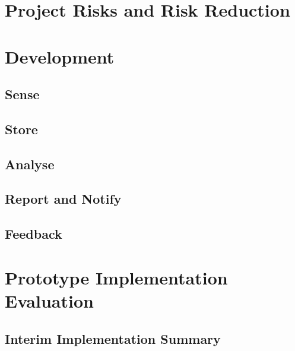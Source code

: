 \documentclass[10pt,a4paper]{article}
\begin{document}
\section{Project Risks and Risk Reduction}
\label{sec:risks}

\section{Development}
\label{sec:development}


\subsection{Sense}
\label{sec:sense}


\subsection{Store}
\label{sec:store}


\subsection{Analyse}
\label{sec:analyse}


\subsection{Report and Notify}
\label{sec:report}


\subsection{Feedback}
\label{sec:feedback}

\section{Prototype Implementation Evaluation}
\label{sec:prototype}


\subsection{Interim Implementation Summary}
\label{sec:interim_summary}
\end{document}
